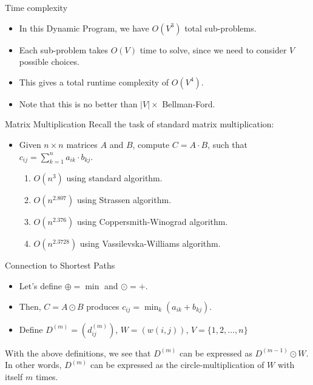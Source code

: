 \documentclass[aspectratio=169]{beamer}
\begin{document}
\begin{frame}{Time complexity}
    \begin{itemize}
        \item In this Dynamic Program, we have $O(V^3)$ total sub-problems.
        \item Each sub-problem takes $O(V)$ time to solve, since we need to consider $V$ possible choices.
        \item This gives a total runtime complexity of $O(V^4)$.
        \item Note that this is no better than $|V| \times$ Bellman-Ford.
    \end{itemize}
\end{frame}

\begin{frame}{Matrix Multiplication}
    Recall the task of standard matrix multiplication:
    \begin{itemize}
        \item Given $n \times n$ matrices $A$ and $B$, compute $C = A \cdot B$, such that $c_{ij} = \sum_{k=1}^{n} a_{ik} \cdot b_{kj}$. \pause
        \begin{enumerate}
            \item $O(n^3)$ using standard algorithm. \pause
            \item $O(n^{2.807})$  using Strassen algorithm. \pause
            \item $O(n^{2.376})$  using Coppersmith-Winograd algorithm. \pause
            \item $O(n^{2.3728})$ using Vassilevska-Williams algorithm.
        \end{enumerate}
    \end{itemize}
\end{frame}

\begin{frame}{Connection to Shortest Paths}
    \begin{itemize}
        \item Let's define $\oplus = \min$ and $\odot = +$.
        \item Then, $C = A \odot B$ produces $c_{ij} = \min_k (a_{ik} + b_{kj})$.
        \item Define $D^{(m)} = (d_{ij}^{(m)})$, $W = (w(i, j))$, $V = \{1,2, \ldots, n\}$
    \end{itemize}
    \bigskip
    With the above deﬁnitions, we see that $D^{(m)}$ can be expressed as $D^{(m-1)} \odot W$. In other words, $D^{(m)}$ can be expressed as the circle-multiplication of $W$ with itself $m$ times.
\end{frame}
\end{document}
